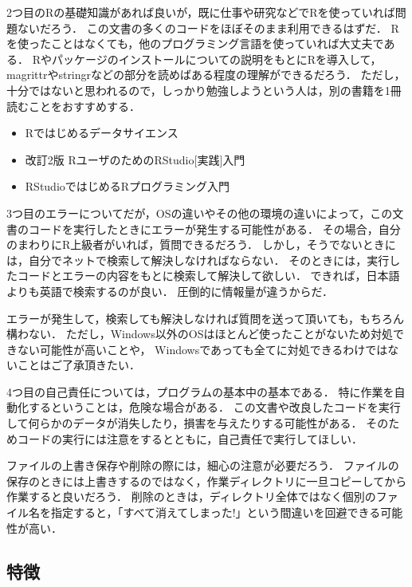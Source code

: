 \documentclass[
]{article}
\providecommand{\tightlist}{%
  \setlength{\itemsep}{0pt}\setlength{\parskip}{0pt}}
\begin{document}
2つ目のRの基礎知識があれば良いが，既に仕事や研究などでRを使っていれば問題ないだろう．
この文書の多くのコードをほぼそのまま利用できるはずだ．
Rを使ったことはなくても，他のプログラミング言語を使っていれば大丈夫である．
Rやパッケージのインストールについての説明をもとにRを導入して，magrittrやstringrなどの部分を読めばある程度の理解ができるだろう．
ただし，十分ではないと思われるので，しっかり勉強しようという人は，別の書籍を1冊読むことをおすすめする．

\begin{itemize}
\tightlist
\item
  Rではじめるデータサイエンス\\
\item
  改訂2版 RユーザのためのRStudio{[}実践{]}入門\\
\item
  RStudioではじめるRプログラミング入門
\end{itemize}

3つ目のエラーについてだが，OSの違いやその他の環境の違いによって，この文書のコードを実行したときにエラーが発生する可能性がある．
その場合，自分のまわりにR上級者がいれば，質問できるだろう．
しかし，そうでないときには，自分でネットで検索して解決しなければならない．
そのときには，実行したコードとエラーの内容をもとに検索して解決して欲しい．
できれば，日本語よりも英語で検索するのが良い．
圧倒的に情報量が違うからだ．

エラーが発生して，検索しても解決しなければ質問を送って頂いても，もちろん構わない．
ただし，Windows以外のOSはほとんど使ったことがないため対処できない可能性が高いことや，
Windowsであっても全てに対処できるわけではないことはご了承頂きたい．

4つ目の自己責任については，プログラムの基本中の基本である．
特に作業を自動化するということは，危険な場合がある．
この文書や改良したコードを実行して何らかのデータが消失したり，損害を与えたりする可能性がある．
そのためコードの実行には注意をするとともに，自己責任で実行してほしい．

ファイルの上書き保存や削除の際には，細心の注意が必要だろう．
ファイルの保存のときには上書きするのではなく，作業ディレクトリに一旦コピーしてから作業すると良いだろう．
削除のときは，ディレクトリ全体ではなく個別のファイル名を指定すると，「すべて消えてしまった!」という間違いを回避できる可能性が高い．

\hypertarget{ux7279ux5fb4}{%
\subsection{特徴}\label{ux7279ux5fb4}}
\end{document}
